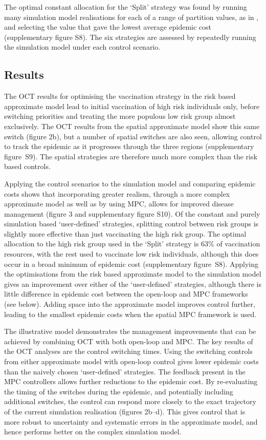 The optimal constant allocation for the `Split' strategy was found by running many simulation model realisations for each of a range of partition values, as in \citep{cunniffe_optimising_2015}, and selecting the value that gave the lowest average epidemic cost (supplementary figure S8). The six strategies are assessed by repeatedly running the simulation model under each control scenario.


\subsection*{Results}

The OCT results for optimising the vaccination strategy in the risk based approximate model lead to initial vaccination of high risk individuals only, before switching priorities and treating the more populous low risk group almost exclusively. The OCT results from the spatial approximate model show this same switch (figure 2b), but a number of spatial switches are also seen, allowing control to track the epidemic as it progresses through the three regions (supplementary figure~S9). The spatial strategies are therefore much more complex than the risk based controls.

Applying the control scenarios to the simulation model and comparing epidemic costs shows that incorporating greater realism, through a more complex approximate model as well as by using MPC, allows for improved disease management (figure 3 and supplementary figure S10). Of the constant and purely simulation based `user-defined' strategies, splitting control between risk groups is slightly more effective than just vaccinating the high risk group. The optimal allocation to the high risk group used in the `Split' strategy is 63\% of vaccination resources, with the rest used to vaccinate low risk individuals, although this does occur in a broad minimum of epidemic cost (supplementary figure~S8). Applying the optimisations from the risk based approximate model to the simulation model gives an improvement over either of the `user-defined' strategies, although there is little difference in epidemic cost between the open-loop and MPC frameworks (see below). Adding space into the approximate model improves control further, leading to the smallest epidemic costs when the spatial MPC framework is used.

The illustrative model demonstrates the management improvements that can be achieved by combining OCT with both open-loop and MPC. The key results of the OCT analyses are the control switching times. Using the switching controls from either approximate model with open-loop control gives lower epidemic costs than the naively chosen `user-defined' strategies. The feedback present in the MPC controllers allows further reductions to the epidemic cost. By re-evaluating the timing of the switches during the epidemic, and potentially including additional switches, the control can respond more closely to the exact trajectory of the current simulation realisation (figures 2b--d). This gives control that is more robust to uncertainty and systematic errors in the approximate model, and hence performs better on the complex simulation model.

